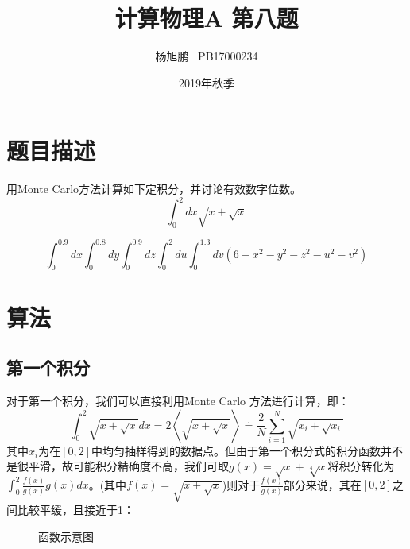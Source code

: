 \documentclass[a4paper,11pt]{article}
\author{ 杨旭鹏  \  PB17000234}
\date{2019年秋季}
\title{计算物理A 第八题}
\begin{document}
\maketitle

\section{题目描述}
用Monte Carlo方法计算如下定积分，并讨论有效数字位数。
\begin{equation}
\int^{2}_{0}dx\sqrt{x+\sqrt{x}}
\end{equation}

\begin{equation}
\int^{0.9}_{0}dx\int^{0.8}_{0}dy\int^{0.9}_{0}dz\int^{2}_{0}du\int^{1.3}_{0}dv (6-x^{2}-y^{2}-z^{2}-u^{2}-v^{2})
\end{equation}



\section{算法}
\subsection{第一个积分}
对于第一个积分，我们可以直接利用Monte Carlo 方法进行计算，即：
\begin{equation}
	\int^{2}_{0}\sqrt{x+\sqrt{x}}dx = 2\left<  \sqrt{x+\sqrt{x}} \right> \doteq \frac{2}{N} \sum  _{i=1}^{N} \sqrt{x_{i}+\sqrt{x_{i}}}
\end{equation}
其中$x_{i}$为在$[0,2]$中均匀抽样得到的数据点。但由于第一个积分式的积分函数并不是很平滑，故可能积分精确度不高，我们可取$g(x)  = \sqrt{x}+\sqrt[4]{x}$将积分转化为$\int^{2}_{0}\frac{f(x)}{g(x)}g(x)dx$。(其中$f(x) = \sqrt{x+\sqrt{x}}$)则对于$\frac{f(x)}{g(x)}$部分来说，其在$[0,2]$之间比较平缓，且接近于1：

\begin{figure}[!htbp]   
\centering     
{}
\caption{函数示意图}      
\end{figure}
\end{document}
